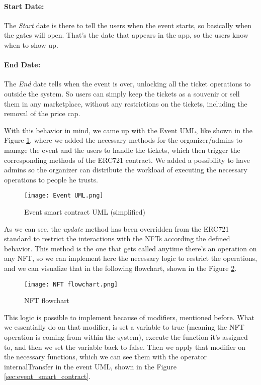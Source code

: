 \paragraph{Start Date:} The \textit{Start} date is there to tell the users when the event starts, so
basically when the gates will open. That's the date that appears in the app, so
the users know when to show up.

\paragraph{End Date:} The \textit{End} date tells when the event is over, unlocking all the ticket
operations to outside the system. So users can simply keep the tickets as a
souvenir or sell them in any marketplace, without any restrictions on the
tickets, including the removal of the price cap.

With this behavior in mind, we came up with the Event UML, like shown in the
Figure \ref{fig:event_uml}, where we added the necessary methods for the
organizer/admins to manage the event and the users to handle the tickets, which
then trigger the corresponding methods of the ERC721 contract. We added a
possibility to have admins so the organizer can distribute the workload of
executing the necessary operations to people he trusts.

\begin{figure}[H]
	\texttt{[image: Event UML.png]}
	\centering
	\caption{Event smart contract UML (simplified)}
	\label{fig:event_uml}
\end{figure}

As we can see, the \textit{update} method has been overridden from the ERC721
standard to restrict the interactions with the NFTs according the defined
behavior. This method is the one that gets called anytime there's an operation
on any NFT, so we can implement here the necessary logic to restrict the
operations, and we can visualize that in the following flowchart, shown in the
Figure \ref{fig:nft_flowchart}.

\begin{figure}[H]
	\texttt{[image: NFT flowchart.png]}
	\centering
	\caption{NFT flowchart}
	\label{fig:nft_flowchart}
\end{figure}

This logic is possible to implement because of modifiers, mentioned before.
What we essentially do on that modifier, is set a variable to true (meaning the
NFT operation is coming from within the system), execute the function it's
assigned to, and then we set the variable back to false. Then we apply that
modifier on the necessary functions, which we can see them with the operator
	{internalTransfer} in the event UML, shown in the Figure
\ref{sec:event_smart_contract}.

